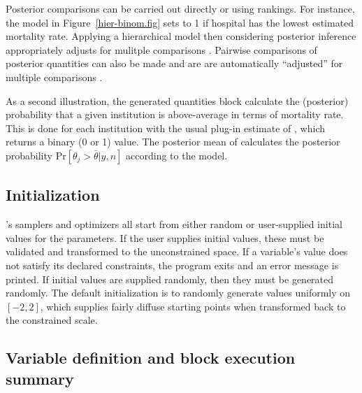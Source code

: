 \documentclass[article]{jss}
\begin{document}
Posterior comparisons can be carried out directly or using rankings.
For instance, the model in Figure~\ref{hier-binom.fig} sets
 to 1 if hospital  has the lowest estimated
mortality rate.  Applying a hierarchical model then considering
posterior inference appropriately adjusts for mulitple comparisons
\citep{GelmanEtAl:2012}.  Pairwise comparisons of posterior quantities
can also be made and are are automatically ``adjusted'' for multiple
comparisons \citep{Efron:2010}.


As a second illustration, the generated quantities block calculate the
(posterior) probability that a given institution is above-average in
terms of mortality rate.  This is done for each institution 
with the usual plug-in estimate of ,
which returns a binary (0 or 1) value.  The posterior mean of
 calculates the posterior probability
$\mbox{Pr}[\theta_j > \bar{\theta}|y,n]$ according to the model.

\subsection{Initialization}

's samplers and optimizers all start from either random
or user-supplied initial values for the parameters.  If the user
supplies initial values, these must be validated and transformed to
the unconstrained space.  If a variable's value does not satisfy its
declared constraints, the program exits and an error message is
printed.  If initial values are supplied randomly, then they must be
generated randomly.  The default initialization is to randomly
generate values uniformly on $[-2,2]$, which supplies fairly diffuse
starting points when transformed back to the constrained scale.

\subsection{Variable definition and block execution summary}
\end{document}
